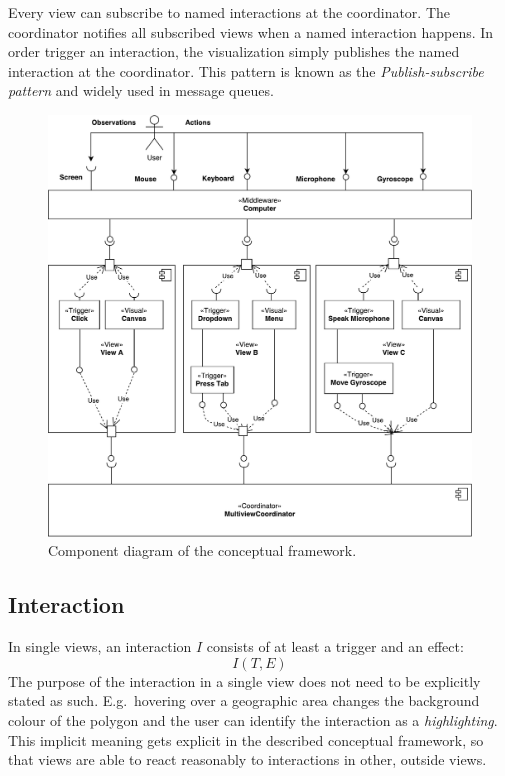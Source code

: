 Every view can subscribe to named interactions at the coordinator.
The coordinator notifies all subscribed views when a named interaction happens.
In order trigger an interaction, the visualization simply publishes the named interaction at the coordinator.
This pattern is known as the \emph{Publish-subscribe pattern} and widely used in message queues.


\begin{figure}[ht]
  \centering
  \includegraphics[width=\textwidth]{figures/concept/Concept}
  \caption{%
    Component diagram of the conceptual framework.
  }\label{fig:concept:component-diagram}
\end{figure}


\subsection{Interaction}
In single views, an interaction $I$ consists of at least a trigger and an effect:
\begin{equation}
  I(T, E)
\end{equation}
The purpose of the interaction in a single view does not need to be explicitly stated as such.
E.g.\ hovering over a geographic area changes the background colour of the polygon and the user can identify the interaction as a \emph{highlighting}.
This implicit meaning gets explicit in the described conceptual framework, so that views are able to react reasonably to interactions in other, outside views.

